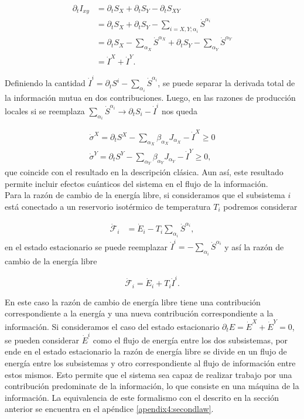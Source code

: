\begin{align*}
    \partial_{t}I_{xy} & = \partial_{t}S_{X} + \partial_{t}S_{Y} - \partial_{t}S_{XY} \\
        & = \partial_{t}S_{X} + \partial_{t}S_{Y} - \sum_{i=X,Y;\alpha_{i}}\dot{S}^{\alpha_{i}} \\
        & =  \partial_{t}S_{X} - \sum_{\alpha_{X}} \dot{S}^{\alpha_{X}} + \partial_{t}S_{Y} - \sum_{\alpha_{Y}} \dot{S}^{\alpha_{Y}} \\
        & = \dot{I}^{X} + \dot{I}^{Y}.
\end{align*}

Definiendo la cantidad $\dot{I}^{i} = \partial_{t}S^{i} - \sum_{\alpha_{i}} \dot{S}^{\alpha_{i}} $, se puede separar la derivada total de la información mutua en dos contribuciones. Luego, en las razones de producción locales si se reemplaza $\sum_{\alpha_{i}}\dot{S}^{\alpha_{i}} \to \partial_{t}S_{i} - \dot{I}^{i} $ nos queda 

\begin{align*}
    \dot{\sigma}^{X} = \partial_{t}S^{X} - \sum_{\alpha_{X}} \beta_{\alpha_{X}} J_{\alpha_{X}} - \dot{I}^{X} \geq 0 \\
    \dot{\sigma}^{Y} = \partial_{t}S^{Y} - \sum_{\alpha_{Y}} \beta_{\alpha_{Y}} J_{\alpha_{Y}} - \dot{I}^{Y} \geq 0,
\end{align*}
que coincide con el resultado en la descripción clásica. Aun así, este resultado permite incluir efectos cuánticos del sistema en el flujo de la información.\\
Para la razón de cambio de la energía libre, si consideramos que el subsistema $i$ está conectado a un reservorio isotérmico de temperatura $T_{i}$ podremos considerar

\begin{align*}
    \dot{\mathcal{F}}_{i} & = \dot{E}_{i} - T_{i} \sum_{\alpha_{i}}\dot{S}^{\alpha_{i}}, 
\end{align*}
en el estado estacionario se puede reemplazar $\dot{I}^{i} = - \sum_{\alpha_{i}}\dot{S}^{\alpha_{i}}$ y así la razón de cambio de la energía libre
\label{sec4:flujos0}

\begin{equation*}
    \dot{\mathcal{F}}_{i} = \dot{E}_{i} + T_{i} \dot{I}^{i}.
\end{equation*}

En este caso la razón de cambio de energía libre tiene una contribución correspondiente a la energía y una nueva contribución correspondiente a la información. Si consideramos el caso del estado estacionario $\partial_{t}E = \dot{E}^{X} + \dot{E}^{Y} = 0$, se pueden considerar $\dot{E}^{i}$ como el flujo de energía entre los dos subsistemas, por ende en el estado estacionario la razón de energía libre se divide en un flujo de energía entre los subsistemas y otro correspondiente al flujo de información entre estos mismos. Esto permite que el sistema sea capaz de realizar trabajo por una contribución predominate de la información, lo que consiste en una máquina de la información. La equivalencia de este formalismo con el descrito en la sección anterior se encuentra en el apéndice \ref{apendix4:secondlaw}.


